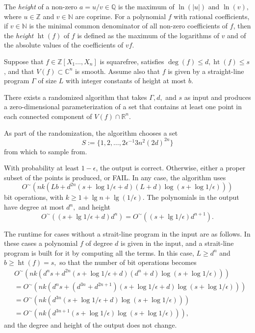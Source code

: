 \documentclass[sigconf]{acmart}
\DeclareMathOperator{\htt}{ht}
\def\C{\mathbb{C}}
\def\Q{\mathbb{Q}}
\def\R{\mathbb{R}}
\newcommand{\ZZ}{{\mathbb{Z}}}
\begin{document}
The {\em height} of a non-zero $a=u/v \in \Q$ is the maximum of
$\ln(|u|)$ and $\ln(v),$ where $u \in \mathbb{Z}$ and $v \in
\mathbb{N}$ are coprime. For a polynomial $f$ with rational
coefficients, if $v \in \mathbb N$ is the minimal common denominator
of all non-zero coefficients of $f$, then the \textit{height}
$\htt(f)$ of $f$ is defined as the maximum of the logarithms of $v$
and of the absolute values of the coefficients of $vf$.

\begin{theorem}\label{theo:main}
  Suppose that $f\in\ZZ[X_1\hdots,X_n]$ is squarefree, satisfies
  $\deg(f) \leq d, \htt(f) \leq s$, and that $V(f) \subset \C^n$ is
  smooth.  Assume also that $f$ is given by a straight-line program
  $\Gamma$ of size $L$ with integer constants of height at most $b.$

  There exists a randomized algorithm that takes $\Gamma, d,$ and $s$
  as input and produces a zero-dimensional parameterization of a set
  that contains at least one point in each connected component of
  $V(f) \cap \R^n$. 
  
  As part of the randomization, the algorithm chooses a set 
  \[
  S := \{1,2,\hdots,2\epsilon^{-1}3n^2(2d)^{2n}\}
  \]
  from which to sample from. 
  
  With probability at least $1-\epsilon$, the output is correct. Otherwise, either a proper subset of the points is produced, or FAIL.  In any case, the algorithm uses
  \[
  O^{\sim}(nk(Lb+d^{2n}(s + \log 1/\epsilon+d)(L+d)\log(s + \log 1/\epsilon)))
  \]
  bit operations, with $k \geq 1 + \lg n + \lg(1/\epsilon)$. The polynomials in
  the output have degree at most $d^n,$ and height 
  \[
  O^{\sim}((s+\lg 1/\epsilon + d)d^n)
  =O^{\sim}((s+\lg 1/\epsilon)d^{n+1}).
  \]
\end{theorem}

The runtime for cases without a strait-line program in the input are as follows. In these cases a polynomial $f$ of degree $d$ is given in the input, and a strait-line program is built for it by computing all the terms. In this case, $L \geq d^n$ and $b \geq \htt(f) = s,$ so that the number of bit operations becomes
\begin{align*}
&O^{\sim}(nk(d^ns+d^{2n}(s + \log 1/\epsilon+d)(d^n+d)\log(s + \log 1/\epsilon)))\\
      &= 
O^{\sim}(nk(d^ns+(d^{3n}+d^{2n+1})(s + \log 1/\epsilon+d)\log(s + \log 1/\epsilon)))\\
     &= 
O^{\sim}(nk(d^{3n}(s + \log 1/\epsilon+d)\log(s + \log 1/\epsilon)))\\
     &= 
O^{\sim}(nk(d^{3n+1}(s + \log 1/\epsilon)\log(s + \log 1/\epsilon))),
\end{align*}
and the degree and height of the output does not change.
\end{document}

